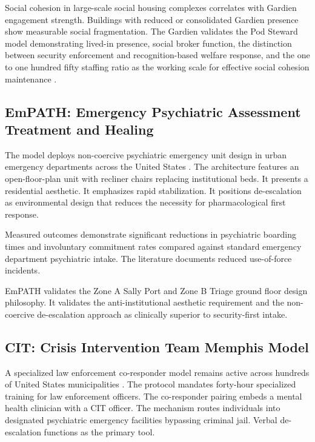\documentclass[12pt, letterpaper]{article}
\begin{document}
Social cohesion in large-scale social housing complexes correlates with Gardien engagement strength. Buildings with reduced or consolidated Gardien presence show measurable social fragmentation. The Gardien validates the Pod Steward model demonstrating lived-in presence, social broker function, the distinction between security enforcement and recognition-based welfare response, and the one to one hundred fifty staffing ratio as the working scale for effective social cohesion maintenance \citep{dunbar_1992}.

\subsection{EmPATH: Emergency Psychiatric Assessment Treatment and Healing}

The model deploys non-coercive psychiatric emergency unit design in urban emergency departments across the United States \citep{empath_model_2020}. The architecture features an open-floor-plan unit with recliner chairs replacing institutional beds. It presents a residential aesthetic. It emphasizes rapid stabilization. It positions de-escalation as environmental design that reduces the necessity for pharmacological first response.

Measured outcomes demonstrate significant reductions in psychiatric boarding times and involuntary commitment rates compared against standard emergency department psychiatric intake. The literature documents reduced use-of-force incidents.

EmPATH validates the Zone A Sally Port and Zone B Triage ground floor design philosophy. It validates the anti-institutional aesthetic requirement and the non-coercive de-escalation approach as clinically superior to security-first intake.

\subsection{CIT: Crisis Intervention Team Memphis Model}

A specialized law enforcement co-responder model remains active across hundreds of United States municipalities \citep{cit_memphis_model_2023}. The protocol mandates forty-hour specialized training for law enforcement officers. The co-responder pairing embeds a mental health clinician with a CIT officer. The mechanism routes individuals into designated psychiatric emergency facilities bypassing criminal jail. Verbal de-escalation functions as the primary tool.
\end{document}
